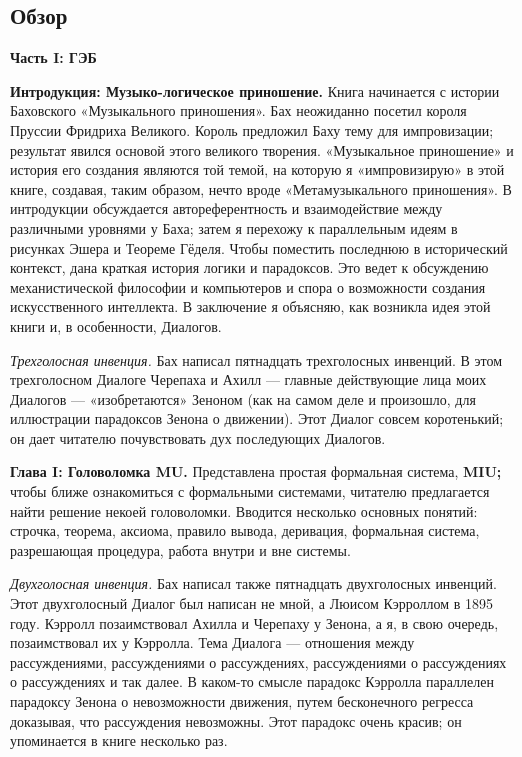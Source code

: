 \subsection{Обзор}

\textbf{Часть I: ГЭБ}

\textbf{Интродукция: Музыко-логическое приношение.} Книга начинается с истории Баховского «Музыкального приношения». Бах неожиданно посетил короля Пруссии Фридриха Великого. Король предложил Баху тему для импровизации; результат явился основой этого великого творения. «Музыкальное приношение» и история его создания являются той темой, на которую я «импровизирую» в этой книге, создавая, таким образом, нечто вроде «Метамузыкального приношения». В интродукции обсуждается автореферентность и взаимодействие между различными уровнями у Баха; затем я перехожу к параллельным идеям в рисунках Эшера и Теореме Гёделя. Чтобы поместить последнюю в исторический контекст, дана краткая история логики и парадоксов. Это ведет к обсуждению механистической философии и компьютеров и спора о возможности создания искусственного интеллекта. В заключение я объясняю, как возникла идея этой книги и, в особенности, Диалогов.

\emph{Трехголосная инвенция.} Бах написал пятнадцать трехголосных инвенций. В этом трехголосном Диалоге Черепаха и Ахилл --- главные действующие лица моих Диалогов --- «изобретаются» Зеноном (как на самом деле и произошло, для иллюстрации парадоксов Зенона о движении). Этот Диалог совсем коротенький; он дает читателю почувствовать дух последующих Диалогов.

\textbf{Глава I: Головоломка MU.} Представлена простая формальная система, \textbf{MIU;} чтобы ближе ознакомиться с формальными системами, читателю предлагается найти решение некоей головоломки. Вводится несколько основных понятий: строчка, теорема, аксиома, правило вывода, деривация, формальная система, разрешающая процедура, работа внутри и вне системы.

\emph{Двухголосная инвенция.} Бах написал также пятнадцать двухголосных инвенций. Этот двухголосный Диалог был написан не мной, а Люисом Кэрроллом в 1895 году. Кэрролл позаимствовал Ахилла и Черепаху у Зенона, а я, в свою очередь, позаимствовал их у Кэрролла. Тема Диалога --- отношения между рассуждениями, рассуждениями о рассуждениях, рассуждениями о рассуждениях о рассуждениях и так далее. В каком-то смысле парадокс Кэрролла параллелен парадоксу Зенона о невозможности движения, путем бесконечного регресса доказывая, что рассуждения невозможны. Этот парадокс очень красив; он упоминается в книге несколько раз.

